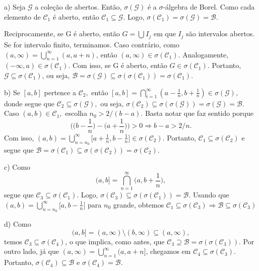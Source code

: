 \documentclass[measure_theory.tex]{subfiles}
\begin{document}
\begin{proof*}
	a) Seja \(\mathcal{G}\) a coleção de abertos. Então, \(\sigma (\mathcal{G})\) é a \(\sigma \)-álgebra de Borel. Como cada elemento de \(\mathcal{C}_{1}\) é aberto, então \(\mathcal{C}_{1}\subseteq \mathcal{G}.\) Logo,
	\(\sigma(\mathcal{C}_{1}) = \sigma (\mathcal{G}) = \mathcal{B}.\)

	Reciprocamente, se G é aberto, então \(G = \bigcup_{}^{}I_{j}\) em que \(I_{j}\) são intervalos abertos. Se for intervalo finito, terminamos. Caso contrário, como \((a, \infty) = \bigcup_{n=1}^{\infty}(a, a + n)\), então
	\((a, \infty)\in \sigma (\mathcal{C}_{1})\). Analogamente, \((-\infty, a)\in \sigma (\mathcal{C}_{1}).\) Com isso, se G é aberto, então \(G\in \sigma (\mathcal{C}_{1})\). Portanto, \(\mathcal{G}\subseteq \sigma (\mathcal{C}_{1})\), ou seja,
	\(\mathcal{B} = \sigma (\mathcal{G})\subseteq \sigma (\sigma (\mathcal{C}_{1})) = \sigma (\mathcal{C}_{1}).\)

	b) Se \([a, b]\) pertence a \(\mathcal{C}_{2},\) então \([a, b] = \bigcap_{i=1}^{\infty}(a-\frac{1}{n}, b+\frac{1}{n})\in \sigma (\mathcal{G}),\) donde segue que \(\mathcal{C}_{2}\subseteq \sigma (\mathcal{G}),\)
	ou seja, \(\sigma (\mathcal{C}_{2})\subseteq \sigma (\sigma (\mathcal{G})) = \sigma (\mathcal{G}) = \mathcal{B}.\) Caso \((a, b)\in \mathcal{C}_{1},\) escolha \(n_{0} > 2/(b-a).\) Basta notar que faz sentido porque
	\[
		\biggl(\biggl(b-\frac{1}{n}\biggr) - \biggl(a + \frac{1}{n}\biggr)\biggr) > 0 \Rightarrow b - a >2/n.
	\]
	Com isso, \((a, b) = \bigcup_{n=n_{0}}^{\infty}\biggl[a+\frac{1}{n}, b-\frac{1}{n}\biggr]\in \sigma (\mathcal{C}_{2}).\) Portanto, \(\mathcal{C}_{1}\subseteq \sigma (\mathcal{C}_{2})\) e
	segue que \(\mathcal{B} = \sigma (\mathcal{C}_{1})\subseteq \sigma (\sigma (\mathcal{C}_{2})) = \sigma (\mathcal{C}_{2})\).

	c) Como
	\[
		(a, b] = \bigcap_{n=1}^{\infty}\biggl(a, b+\frac{1}{n}\biggr),
	\]
	segue que \(\mathcal{C}_3 \subseteq \sigma (\mathcal{C}_1)\). Logo, \(\sigma (\mathcal{C}_3)\subseteq \sigma (\sigma (\mathcal{C}_1)) = \mathcal{B}.\) Usando que \((a, b) = \bigcup_{n=n_{0}}^{\infty}\biggl[a, b-\frac{1}{n}\biggr]\) para \(n_{0}\) grande,
	obtemos \(\mathcal{C}_{1} \subseteq \sigma (\mathcal{C}_{3}) \Rightarrow \mathcal{B} \subseteq \sigma (\mathcal{C}_3)\)

	d) Como
	\[
		(a, b] = (a, \infty)\setminus{(b, \infty)} \subseteq (a, \infty),
	\]
	temos \(\mathcal{C}_{3}\subseteq \sigma (\mathcal{C}_{4})\), o que implica, como antes, que \(\mathcal{C}_{3}\supseteq  \mathcal{B} = \sigma (\sigma (\mathcal{C}_{3}))\). Por outro lado, já que \((a, \infty) = \bigcup_{n=1}^{\infty}(a, a + n]\), chegamos em
	\(\mathcal{C}_{4} \subseteq \sigma (\mathcal{C}_{3}).\) Portanto, \(\sigma (\mathcal{C}_{4})\subseteq \mathcal{B}\) e \(\sigma (\mathcal{C}_{4}) = \mathcal{B}.\) \qedsymbol
\end{proof*}
\end{document}
